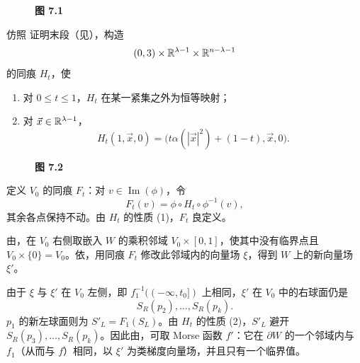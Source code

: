 \begin{figure}[htbp]
  \centering
  \par\smallskip{}\label{fig:7.1}\textbf{图 7.1}
\end{figure}

仿照 证明末段（见），构造
\[
  (0,3)\times\mathbb{R}^{\lambda-1}\times\mathbb{R}^{n-\lambda-1}
\]
的同痕 $H_t$，使
\begin{enumerate}[label=(\arabic*)]
  \item 对 $0\leq t\leq1$，$H_t$ 在某一紧集之外为恒等映射；
  \item 对 $\vec x\in\mathbb{R}^{\lambda-1}$，
  \[
    H_t(1,\vec x,0)
    =\bigl(t\alpha(|\vec x|^2)+(1-t),\vec x,0\bigr).
  \]
\end{enumerate}

\begin{figure}[htbp]
  \centering
  \FigSevenTwo
  \par\smallskip{}\label{fig:7.2}\textbf{图 7.2}
\end{figure}

定义 $V_0$ 的同痕 $F_t$：对 $v\in\operatorname{Im}(\phi)$，令
\[
  F_t(v)=\phi\circ H_t\circ\phi^{-1}(v),
\]
其余各点保持不动。由 $H_t$ 的性质 (1)，$F_t$ 良定义。

由，在 $V_0$ 右侧取嵌入 $W$ 的乘积邻域 $V_0\times[0,1]$，使其中没有临界点且 $V_0\times\{0\}=V_0$。依，用同痕 $F_t$ 修改此邻域内的向量场 $\xi$，得到 $W$ 上的新向量场 $\xi'$。

由于 $\xi$ 与 $\xi'$ 在 $V_0$ 左侧，即 $f_1^{-1}((-\infty,t_0])$ 上相同，$\xi'$ 在 $V_0$ 中的右球面仍是
\[
  S_R(p_2),\ldots,S_R(p_k).
\]
$p_1$ 的新左球面则为 $S'_L=F_1(S_L)$。由 $H_t$ 的性质 (2)，$S'_L$ 避开 $S_R(p_3),\ldots,S_R(p_k)$。因此由，可取 Morse 函数 $f'$：它在 $\partial W$ 的一个邻域内与 $f_1$（从而与 $f$）相同，以 $\xi'$ 为类梯度向量场，并且只有一个临界值。


